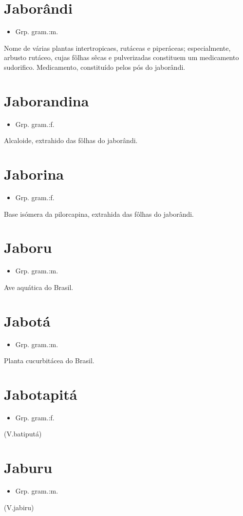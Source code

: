 \documentclass{article}
\begin{document}
\section{Jaborândi}
\begin{itemize}
\item {Grp. gram.:m.}
\end{itemize}
Nome de várias plantas intertropicaes, rutáceas e piperáceas; especialmente, arbusto rutáceo, cujas fôlhas sêcas e pulverizadas constituem um medicamento sudorifico.
Medicamento, constituído pelos pós do jaborândi.
\section{Jaborandina}
\begin{itemize}
\item {Grp. gram.:f.}
\end{itemize}
Alcaloide, extrahido das fôlhas do jaborândi.
\section{Jaborina}
\begin{itemize}
\item {Grp. gram.:f.}
\end{itemize}
Base isómera da pilorcapina, extrahida das fôlhas do jaborândi.
\section{Jaboru}
\begin{itemize}
\item {Grp. gram.:m.}
\end{itemize}
Ave aquática do Brasil.
\section{Jabotá}
\begin{itemize}
\item {Grp. gram.:m.}
\end{itemize}
Planta cucurbitácea do Brasil.
\section{Jabotapitá}
\begin{itemize}
\item {Grp. gram.:f.}
\end{itemize}
(V.batiputá)
\section{Jaburu}
\begin{itemize}
\item {Grp. gram.:m.}
\end{itemize}
(V.jabiru)
\end{document}
